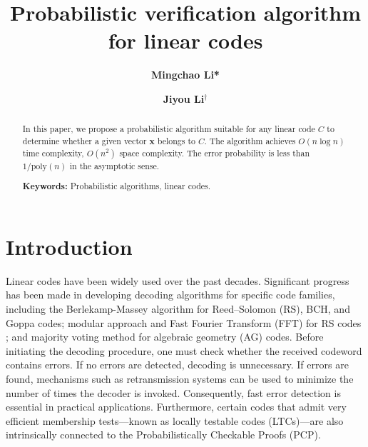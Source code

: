 \documentclass[a4paper, 10pt]{article}
\title{\LARGE
\textbf{Probabilistic verification algorithm for linear codes}}
\author[1]{\small\textbf {{Mingchao Li*}}}
\author[1]{\small\textbf {{Jiyou Li{$^\dagger$}}}}
\affil[1]{\small School of Mathematical Sciences, Shanghai Jiao Tong University, Shanghai, P.R.China}
\date{}
\begin{document}
\maketitle
\thispagestyle{fancy} %
\fancyhf{} %
\fancyhead{} %
\fancyfoot{} %
\renewcommand{\headrulewidth}{0pt}
\renewcommand{\footrulewidth}{0.4pt}

\begin{abstract}
In this paper, we propose a probabilistic algorithm suitable for any linear code $C$ to determine whether a given vector $\mathbf{x}$ belongs to $ C$. The algorithm achieves $O(n\log n)$ time complexity, $ O(n^2)$ space complexity. The error probability is less than $1/\mathrm{poly}(n)$ in the asymptotic sense.


 \vskip 2mm

\textbf{Keywords:} Probabilistic algorithms, linear codes.

\end{abstract}

\section{Introduction}

Linear codes have been widely used over the past decades. Significant progress has been made in developing decoding algorithms for specific code families, including the Berlekamp-Massey algorithm \cite{1054260} for Reed–Solomon (RS), BCH, and Goppa codes; modular approach and Fast Fourier Transform (FFT) for RS codes \cite{9925209}; and majority voting method \cite{179340} for algebraic geometry (AG) codes.   Before initiating the decoding procedure, one must check whether the received codeword contains errors. If no errors are detected, decoding is unnecessary. If errors are found, mechanisms such as retransmission systems can be used to minimize the number of times the decoder is invoked. Consequently, fast error detection is essential in practical applications.  Furthermore, certain codes that admit very efficient membership tests---known as locally testable codes (LTCs)---are also intrinsically connected to the Probabilistically Checkable Proofs (PCP).
\end{document}
